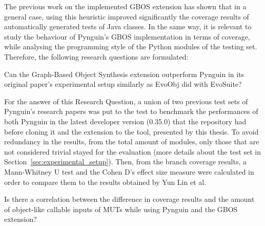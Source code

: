 \documentclass[%
  chapterprefix=false,%
  open=right,%
  twoside=true,%
  paper=a4,%
  logofile={Figures/logo.png},%
  thesistype=master,%
  UKenglish,%
]{se2thesis}
\begin{document}
The previous work on the implemented GBOS extension has shown that in a general case, using this heuristic improved significantly the coverage results of automatically generated tests of Java classes.
In the same way, it is relevant to study the behaviour of Pynguin's GBOS implementation in terms of coverage, while analysing the programming style of the Python modules of the testing set.
Therefore, the following research questions are formulated:

\begin{resq}
  Can the Graph-Based Object Synthesis extension outperform Pynguin in its original paper's experimental setup similarly as EvoObj did with EvoSuite?
\end{resq}

For the answer of this Research Question, a union of two previous test sets of Pynguin's research papers was put to the test to benchmark the performances of both Pynguin in the latest developer version (0.35.0) that the repository had before cloning it and the extension to the tool, presented by this thesis.
To avoid redundancy in the results, from the total amount of modules, only those that are not considered trivial stayed for the evaluation (more details about the test set in Section~\ref{sec:experimental_setup}).
Then, from the branch coverage results, a Mann-Whitney U test and the Cohen D's effect size measure were calculated in order to compare them to the results obtained by Yun Lin et al. 

\begin{resq}
  Is there a correlation between the difference in coverage results and the amount of object-like callable inputs of MUTs while using Pynguin and the GBOS extension?
\end{resq}
\end{document}
